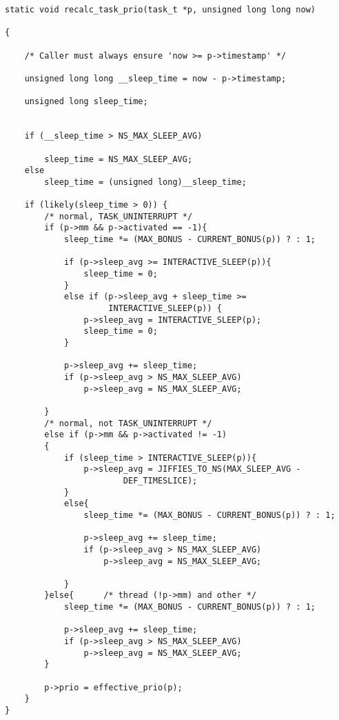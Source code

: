 \documentclass[11pt]{article}
\begin{document}
\begin{verbatim}
static void recalc_task_prio(task_t *p, unsigned long long now)

{

    /* Caller must always ensure 'now >= p->timestamp' */

    unsigned long long __sleep_time = now - p->timestamp;

    unsigned long sleep_time;


    if (__sleep_time > NS_MAX_SLEEP_AVG)

        sleep_time = NS_MAX_SLEEP_AVG;
    else
        sleep_time = (unsigned long)__sleep_time;

    if (likely(sleep_time > 0)) {
        /* normal, TASK_UNINTERRUPT */
        if (p->mm && p->activated == -1){
            sleep_time *= (MAX_BONUS - CURRENT_BONUS(p)) ? : 1;
            
            if (p->sleep_avg >= INTERACTIVE_SLEEP(p)){
                sleep_time = 0;
            }
            else if (p->sleep_avg + sleep_time >=
                     INTERACTIVE_SLEEP(p)) {
                p->sleep_avg = INTERACTIVE_SLEEP(p);
                sleep_time = 0;
            }
            
            p->sleep_avg += sleep_time;
            if (p->sleep_avg > NS_MAX_SLEEP_AVG)
                p->sleep_avg = NS_MAX_SLEEP_AVG;

        }
        /* normal, not TASK_UNINTERRUPT */
        else if (p->mm && p->activated != -1)
        {
            if (sleep_time > INTERACTIVE_SLEEP(p)){
                p->sleep_avg = JIFFIES_TO_NS(MAX_SLEEP_AVG -
                        DEF_TIMESLICE);
            }
            else{
                sleep_time *= (MAX_BONUS - CURRENT_BONUS(p)) ? : 1;
                
                p->sleep_avg += sleep_time;
                if (p->sleep_avg > NS_MAX_SLEEP_AVG)
                    p->sleep_avg = NS_MAX_SLEEP_AVG;
                
            }
        }else{      /* thread (!p->mm) and other */
            sleep_time *= (MAX_BONUS - CURRENT_BONUS(p)) ? : 1;
            
            p->sleep_avg += sleep_time;
            if (p->sleep_avg > NS_MAX_SLEEP_AVG)
                p->sleep_avg = NS_MAX_SLEEP_AVG;
        }

        p->prio = effective_prio(p);
    }
}
\end{verbatim}
\end{document}
